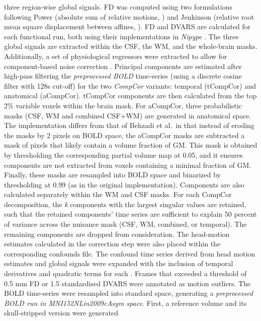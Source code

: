 \documentclass[
]{article}
\begin{document}
\begin{description}
three region-wise global signals. FD was computed using two formulations
following Power (absolute sum of relative motions,
\citet{power_fd_dvars}) and Jenkinson (relative root mean square
displacement between affines, \citet{mcflirt}). FD and DVARS are
calculated for each functional run, both using their implementations in
\emph{Nipype} \citep[following the definitions by][]{power_fd_dvars}.
The three global signals are extracted within the CSF, the WM, and the
whole-brain masks. Additionally, a set of physiological regressors were
extracted to allow for component-based noise correction
\citep[\emph{CompCor},][]{compcor}. Principal components are estimated
after high-pass filtering the \emph{preprocessed BOLD} time-series
(using a discrete cosine filter with 128s cut-off) for the two
\emph{CompCor} variants: temporal (tCompCor) and anatomical (aCompCor).
tCompCor components are then calculated from the top 2\% variable voxels
within the brain mask. For aCompCor, three probabilistic masks (CSF, WM
and combined CSF+WM) are generated in anatomical space. The
implementation differs from that of Behzadi et al.~in that instead of
eroding the masks by 2 pixels on BOLD space, the aCompCor masks are
subtracted a mask of pixels that likely contain a volume fraction of GM.
This mask is obtained by thresholding the corresponding partial volume
map at 0.05, and it ensures components are not extracted from voxels
containing a minimal fraction of GM. Finally, these masks are resampled
into BOLD space and binarized by thresholding at 0.99 (as in the
original implementation). Components are also calculated separately
within the WM and CSF masks. For each CompCor decomposition, the
\emph{k} components with the largest singular values are retained, such
that the retained components' time series are sufficient to explain 50
percent of variance across the nuisance mask (CSF, WM, combined, or
temporal). The remaining components are dropped from consideration. The
head-motion estimates calculated in the correction step were also placed
within the corresponding confounds file. The confound time series
derived from head motion estimates and global signals were expanded with
the inclusion of temporal derivatives and quadratic terms for each
\citep{confounds_satterthwaite_2013}. Frames that exceeded a threshold
of 0.5 mm FD or 1.5 standardised DVARS were annotated as motion
outliers. The BOLD time-series were resampled into standard space,
generating a \emph{preprocessed BOLD run in MNI152NLin2009cAsym space}.
First, a reference volume and its skull-stripped version were generated

\end{description}
\end{document}
